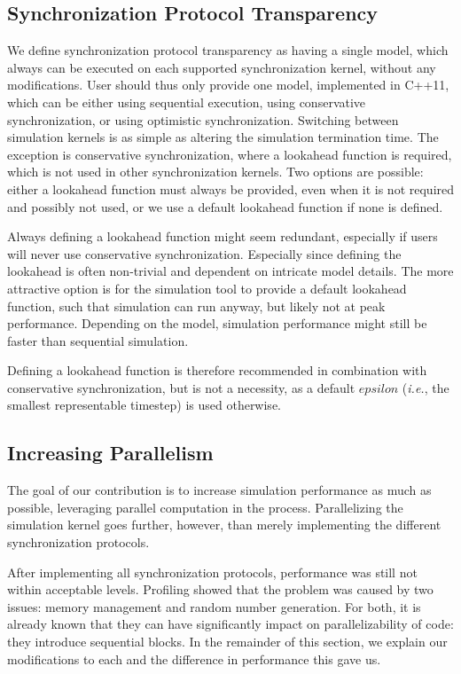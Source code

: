 \subsection{Synchronization Protocol Transparency}
We define synchronization protocol transparency as having a single model, which always can be executed on each supported synchronization kernel, without any modifications.
User should thus only provide one model, implemented in C++11, which can be either using sequential execution, using conservative synchronization, or using optimistic synchronization.
Switching between simulation kernels is as simple as altering the simulation termination time.
The exception is conservative synchronization, where a lookahead function is required, which is not used in other synchronization kernels.
Two options are possible: either a lookahead function must always be provided, even when it is not required and possibly not used, or we use a default lookahead function if none is defined.

Always defining a lookahead function might seem redundant, especially if users will never use conservative synchronization.
Especially since defining the lookahead is often non-trivial and dependent on intricate model details.
The more attractive option is for the simulation tool to provide a default lookahead function, such that simulation can run anyway, but likely not at peak performance.
Depending on the model, simulation performance might still be faster than sequential simulation. 

Defining a lookahead function is therefore recommended in combination with conservative synchronization, but is not a necessity, as a default $epsilon$ (\textit{i.e.}, the smallest representable timestep) is used otherwise.

\subsection{Increasing Parallelism}
The goal of our contribution is to increase simulation performance as much as possible, leveraging parallel computation in the process.
Parallelizing the simulation kernel goes further, however, than merely implementing the different synchronization protocols.

After implementing all synchronization protocols, performance was still not within acceptable levels.
Profiling showed that the problem was caused by two issues: memory management and random number generation.
For both, it is already known that they can have significantly impact on parallelizability of code: they introduce sequential blocks.
In the remainder of this section, we explain our modifications to each and the difference in performance this gave us.

